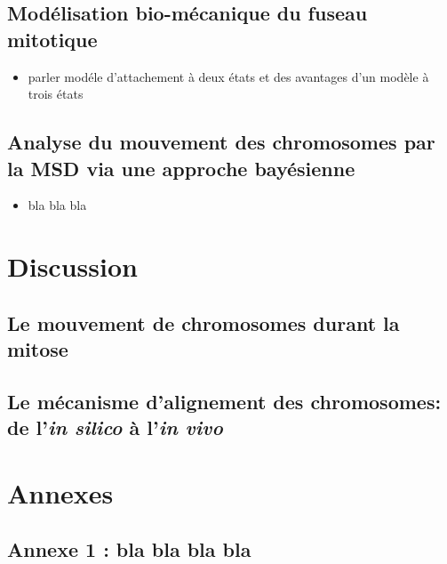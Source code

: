 \documentclass[12pt,a4paper,twoside,openright]{book}
\providecommand{\tightlist}{%
  \setlength{\itemsep}{0pt}\setlength{\parskip}{0pt}}
\begin{document}
\section{Modélisation bio-mécanique du fuseau
mitotique}\label{moduxe9lisation-bio-muxe9canique-du-fuseau-mitotique}

\begin{itemize}
\tightlist
\item
  parler modéle d'attachement à deux états et des avantages d'un modèle
  à trois états
\end{itemize}

\section{Analyse du mouvement des chromosomes par la MSD via une
approche
bayésienne}\label{analyse-du-mouvement-des-chromosomes-par-la-msd-via-une-approche-bayuxe9sienne}

\begin{itemize}
\tightlist
\item
  bla bla bla
\end{itemize}

\chapter{Discussion}\label{discussion}

\section{Le mouvement de chromosomes durant la
mitose}\label{le-mouvement-de-chromosomes-durant-la-mitose}

\section{\texorpdfstring{Le mécanisme d'alignement des chromosomes: de
l'\emph{in silico} à l'\emph{in
vivo}}{Le mécanisme d'alignement des chromosomes: de l'in silico à l'in vivo}}\label{le-muxe9canisme-dalignement-des-chromosomes-de-lin-silico-uxe0-lin-vivo}

\appendix

\chapter{Annexes}\label{annexes}

\section{Annexe 1 : bla bla bla bla}\label{annexe-1-bla-bla-bla-bla}
\end{document}
